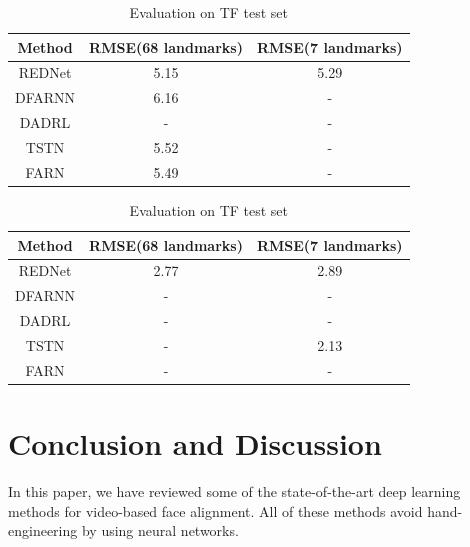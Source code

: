 \documentclass{llncs}
\begin{document}
\begin{table}[htbp]
\centering
\begin{subtable}
\centering
\begin{tabular}{|c|c|c|}
\hline 
\textbf{Method}	 & \textbf{RMSE(68 landmarks)} & \textbf{RMSE(7 landmarks)} \\ 
\hline 
REDNet\textcolor{green}{\cite{rednet}} & 5.15 & 5.29 \\ 
\hline 
DFARNN\textcolor{green}{\cite{dynamic_facial_analysis}} & 6.16 & - \\ 
\hline 
DADRL\textcolor{green}{\cite{dadrl}} & - & - \\ 
\hline 
TSTN\textcolor{green}{\cite{tstn}} & 5.52 & - \\ 
\hline 
FARN\textcolor{green}{\cite{farn}} & 5.49 & - \\ 
\hline 
\end{tabular}
\caption{Evaluation on 300-VW test set}
\label{comparison_300VW}
\end{subtable} 

\begin{subtable}
\centering
\begin{tabular}{|c|c|c|}
\hline 
\textbf{Method}	 & \textbf{RMSE(68 landmarks)} & \textbf{RMSE(7 landmarks)} \\ 
\hline 
REDNet\textcolor{green}{\cite{rednet}} & 2.77 & 2.89 \\ 
\hline 
DFARNN\textcolor{green}{\cite{dynamic_facial_analysis}} & - & - \\ 
\hline 
DADRL\textcolor{green}{\cite{dadrl}} & - & - \\ 
\hline 
TSTN\textcolor{green}{\cite{tstn}} & - & 2.13 \\ 
\hline 
FARN\textcolor{green}{\cite{farn}} & - & - \\ 
\hline 
\end{tabular}
\caption{Evaluation on TF test set}
\label{comparison_TF}
\end{subtable} 

\end{table}



\section{Conclusion and Discussion}

In this paper, we have reviewed some of the state-of-the-art deep learning methods for video-based face alignment. All of these methods avoid hand-engineering by using neural networks. 

%

%
%


%
\end{document}
